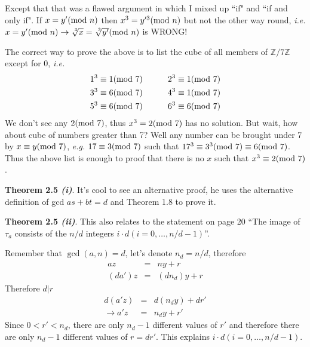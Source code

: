 \documentclass[aps,preprint,preprintnumbers,nofootinbib,showpacs,prd]{revtex4-1}
\newcommand{\ie}{{\it i.e.} }
\newcommand{\eg}{{\it e.g.} }
\newcommand{\nbea}{\begin{eqnarray*}}
\newcommand{\neea}{\end{eqnarray*}}
\begin{document}
Except that that was a flawed argument in which I mixed up ``if" and ``if and only if". If $x = y' ({\rm mod~} n)$ then $x^3 = y'^3 ({\rm mod~} n)$ but not the other way round, \ie $x = y' ({\rm mod~} n) \to \sqrt[\leftroot{-2}\uproot{2}3]{x} = \sqrt[\leftroot{-2}\uproot{2}3]{y'} ({\rm mod~} n)$ is WRONG!

The correct way to prove the above is to list the cube of all members of $\mathbb{Z}/7\mathbb{Z}$ except for 0, \ie
%
\nbea
1^3 \equiv 1({\rm mod~}7) & ~~~~~~ & 2^3 \equiv 1({\rm mod~}7) \\
3^3 \equiv 6({\rm mod~}7) & ~~~~~~ & 4^3 \equiv 1({\rm mod~}7) \\
5^3 \equiv 6({\rm mod~}7) & ~~~~~~ & 6^3 \equiv 6({\rm mod~}7)
\neea
%
We don't see any $2({\rm mod~}7)$, thus $x^3 = 2 ({\rm mod~} 7)$ has no solution. But wait, how about cube of numbers greater than 7? Well any number can be brought under 7 by $x \equiv y({\rm mod~}7)$, \eg $17 \equiv 3({\rm mod~}7)$ such that $17^3 \equiv 3^3({\rm mod~}7) \equiv 6({\rm mod~}7)$. Thus the above list is enough to proof that there is no $x$ such that $x^3 \equiv 2({\rm mod~}7)$.

{\bf Theorem 2.5 {\it(i)}}. It's cool to see an alternative proof, he uses the alternative definition of gcd $as + bt = d$ and Theorem 1.8 to prove it. 

{\bf Theorem 2.5 {\it(ii)}}. This also relates to the statement on page 20 ``The image of $\tau_a$ consists of the $n/d$ integers $i\cdot d (i = 0, \dots, n/d - 1)$''.

Remember that $\gcd(a,n) = d$, let's denote $n_d = n/d$, therefore
%
\nbea
az & = & ny + r \\
(da')z & = & (dn_d)y + r
\neea
%
Therefore $d|r$
%
\nbea
d(a'z) & = & d(n_d y) + dr' \\
\to a'z & = & n_d y + r'
\neea
%
Since $0 < r' < n_d$, there are only $n_d - 1$ different values of $r'$ and therefore there are only $n_d - 1$ different values of $r = dr'$. This explains $i\cdot d (i = 0, \dots, n/d - 1)$.
\end{document}
